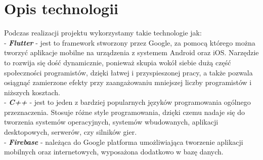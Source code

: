 	\newline\newline
\section{Opis technologii}		%
Podczas realizacji projektu wykorzystamy takie technologie jak:
\\ - \textbf{\textit{Flutter}} - jest to framework stworzony przez Google, za pomocą którego można tworzyć aplikacje mobilne na urządzenia z systemem Android oraz iOS. Narzędzie to rozwija się dość dynamicznie, ponieważ skupia wokół siebie dużą część społeczności programistów, dzięki łatwej i przyspieszonej pracy, a także pozwala osiągnąć zamierzone efekty przy zaangażowaniu mniejszej liczby programistów i niższych kosztach.
\\ - \textbf{\textit{C++}} - jest to jeden z bardziej popularnych języków programowania ogólnego przeznaczenia. Stosuje różne style programowania, dzięki czemu nadaje się do tworzenia systemów operacyjnych, systemów wbudowanych, aplikacji desktopowych, serwerów, czy silników gier. 
\\ - \textbf{\textit{Firebase}} - należąca do Google platforma umożliwiająca tworzenie aplikacji mobilnych oraz internetowych, wyposażona dodatkowo w bazę danych.
